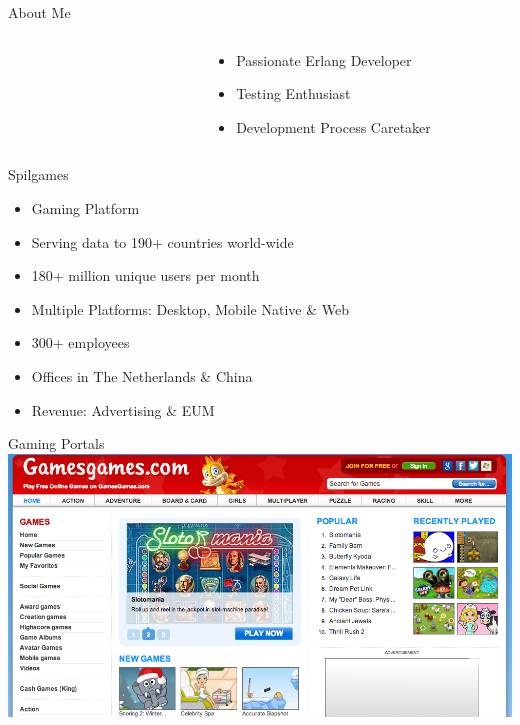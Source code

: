\documentclass[aspectratio=169]{beamer}
\begin{document}
\begin{frame}{About Me}
\begin{columns}
\begin{column}[c]{0.2\textwidth}
        \end{column}
        \begin{column}[c]{0.05\textwidth}
        \end{column}
        \begin{column}[c]{0.7\textwidth}
            \begin{itemize}
                \item Passionate Erlang Developer
                \item Testing Enthusiast
                \item Development Process Caretaker
            \end{itemize}
        \end{column}
    \end{columns}
\end{frame}

\begin{frame}{Spilgames}
    \begin{itemize}
       \item Gaming Platform
       \item Serving data to 190+ countries world-wide
       \item 180+ million unique users per month
       \item Multiple Platforms: Desktop, Mobile Native \& Web
       \item 300+ employees
       \item Offices in The Netherlands \& China
       \item Revenue: Advertising \& EUM
    \end{itemize}
\end{frame}

\begin{frame}{Gaming Portals}
    \includegraphics[width=\textwidth]{images/gamesgames.png}
\end{frame}
\end{document}
